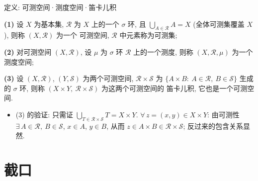 \begin{frame}{定义: 可测空间·测度空间·笛卡儿积}

\begin{Def}
\textbf{(1)} 设 $X$ 为基本集, $\mathscr{R}$ 为 $X$ 上的一个 $\sigma$ 环, 且
$\bigcup_{A \in \mathscr{R}} A = X$ (全体可测集覆盖 $X$), 则称 $(X, \mathscr{R})$ 为一个
\alert{可测空间}, $\mathscr{R}$ 中元素称为可测集;

\pause

\textbf{(2)} 对可测空间 $(X, \mathscr{R})$, 设 $\mu$ 为 $\sigma$ 环
$\mathscr{R}$ 上的一个测度, 则称 $(X, \mathscr{R}, \mu)$ 为一个\alert{测度空间};

\pause

\textbf{(3)} 设 $(X, \mathscr{R})$, $(Y, \mathscr{S})$ 为两个可测空间,
$\mathscr{R} \times \mathscr{S}$ 为 $\{ A \times B:\ A \in \mathscr{R},\ B \in \mathscr{S} \}$
生成的 $\sigma$ 环, 则称 $(X \times Y,\ \mathscr{R} \times \mathscr{S})$ 为这两个可测空间的
\alert{笛卡儿积}, 它也是一个可测空间.
\end{Def}

\pause

\begin{itemize}
\item (3) 的验证: 只需证 $\bigcup_{T \in \mathscr{R} \times \mathscr{S}} T = X \times Y$.
  $\forall\, z = (x, y) \in X \times Y$: 由可测性 $\exists\, A \in \mathscr{R},\ B \in \mathscr{S}$,
  $x \in A$, $y \in B$, 从而 $z \in A \times B \in \mathscr{R} \times \mathscr{S}$;
  反过来的包含关系显然.
\end{itemize}

\end{frame}


\section[截口]{截口}


